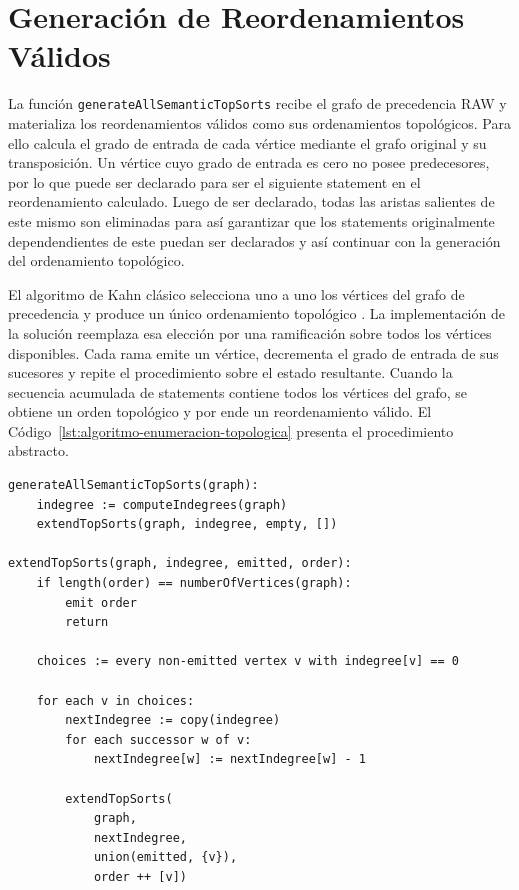 
\section{Generación de Reordenamientos Válidos}
\label{sec:solucion-implementacion-permutaciones}

La función \texttt{generateAllSemanticTopSorts} recibe el grafo de precedencia RAW y materializa los reordenamientos válidos como sus ordenamientos topológicos. Para ello calcula el grado de entrada de cada vértice mediante el grafo original y su transposición. Un vértice cuyo grado de entrada es cero no posee predecesores, por lo que puede ser declarado para ser el siguiente statement en el reordenamiento calculado. Luego de ser declarado, todas las aristas salientes de este mismo son eliminadas para así garantizar que los statements originalmente dependendientes de este puedan ser declarados y así continuar con la generación del ordenamiento topológico.

El algoritmo de Kahn clásico selecciona uno a uno los vértices del grafo de precedencia y produce un único ordenamiento topológico \cite{Kahn1962}. La implementación de la solución reemplaza esa elección por una ramificación sobre todos los vértices disponibles. Cada rama emite un vértice, decrementa el grado de entrada de sus sucesores y repite el procedimiento sobre el estado resultante. Cuando la secuencia acumulada de statements contiene todos los vértices del grafo, se obtiene un orden topológico y por ende un reordenamiento válido. El Código~\ref{lst:algoritmo-enumeracion-topologica} presenta el procedimiento abstracto.

\newpage

\begin{lstlisting}[style=haskell,caption={Pseudocódigo del algoritmo que genera todos los ordenamientos topológicos del grafo de precendencia RAW de un bloque \texttt{do}.},label={lst:algoritmo-enumeracion-topologica}]
generateAllSemanticTopSorts(graph):
    indegree := computeIndegrees(graph)
    extendTopSorts(graph, indegree, empty, [])

extendTopSorts(graph, indegree, emitted, order):
    if length(order) == numberOfVertices(graph):
        emit order
        return

    choices := every non-emitted vertex v with indegree[v] == 0

    for each v in choices:
        nextIndegree := copy(indegree)
        for each successor w of v:
            nextIndegree[w] := nextIndegree[w] - 1

        extendTopSorts(
            graph,
            nextIndegree,
            union(emitted, {v}),
            order ++ [v])
\end{lstlisting}

